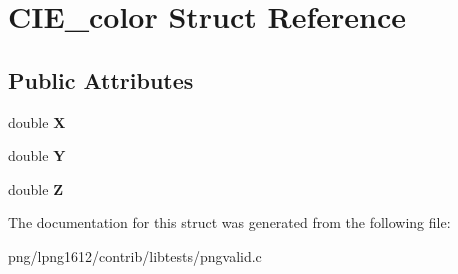 \hypertarget{struct_c_i_e__color}{\section{C\+I\+E\+\_\+color Struct Reference}
\label{struct_c_i_e__color}
}
\subsection*{Public Attributes}
\begin{DoxyCompactItemize}
\item 
\hypertarget{struct_c_i_e__color_a547344c528ff5893317f420963324c92}{double {\bfseries X}}\label{struct_c_i_e__color_a547344c528ff5893317f420963324c92}

\item 
\hypertarget{struct_c_i_e__color_a2ba16bc6d6ff883ad9f61742b2084535}{double {\bfseries Y}}\label{struct_c_i_e__color_a2ba16bc6d6ff883ad9f61742b2084535}

\item 
\hypertarget{struct_c_i_e__color_a284b004670782e29c4afd0644833c343}{double {\bfseries Z}}\label{struct_c_i_e__color_a284b004670782e29c4afd0644833c343}

\end{DoxyCompactItemize}


The documentation for this struct was generated from the following file\+:\begin{DoxyCompactItemize}
\item 
png/lpng1612/contrib/libtests/pngvalid.\+c\end{DoxyCompactItemize}
